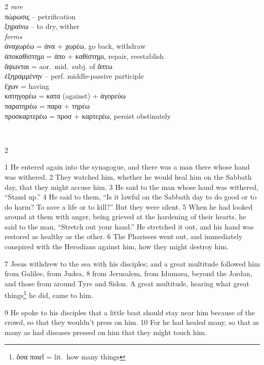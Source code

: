 \documentclass[10pt,a5paper,twoside,twocolumn]{book}
\newcommand*\cleartoleftpage{%
  \ifodd\value{page}\hbox{}\clearpage\fi
}
\newcommand{\separator}{
  \vspace{-0.5\baselineskip}%
  \hspace{0.27\textwidth}%
  \noindent\makebox[\linewidth]{\resizebox{0.3333\linewidth}{1pt}{$\bullet$}}\bigskip%
  \vspace{-0.5\baselineskip}
}
\newenvironment{facing}{\cleartoleftpage}{\clearpage\pagebreak}
\newenvironment{help}{\clearpage}{}
\newenvironment{helpsec}{\begin{minipage}[t]{\textwidth}\begin{multicols}{2}}{\end{multicols}\end{minipage}}
\newenvironment{vocab}{\begin{helpsec}}{\end{helpsec}}
\newenvironment{translation}{\separator\\\begin{helpsec}\footnotesize}{\end{helpsec}}
\begin{document}
\begin{facing}
\begin{help}
\begin{vocab}
\emph{rare}\\
πώρωσις -- petrification\\
ξηραίνω -- to dry, wither\\

\emph{forms}\\
ἀναχωρέω = ἀνα + χωρέω, go back, withdraw\\
ἀποκαθίστημι = ἀπο + καθίστημι, repair, reestablish\\
ἅψωνται = aor.~mid.~subj. of ἅπτω\\
ἐξηραμμένην -- perf. middle-passive participle\\
ἔχων = having\\
κατηγορέω = κατα (against) + ἀγορεύω \\
παρατηρέω = παρα + τηρέω\\
προσκαρτερέω = προσ + καρτερέω, persist obstinately\\
\end{vocab}
\begin{translation}

 1 He entered again into the synagogue, and there was a man there whose hand was withered. 2 They watched him, whether he would heal him on the Sabbath day, that they might accuse him. 
3 He said to the man whose hand was withered, ``Stand up.'' 4 He said to them, ``Is it lawful on the Sabbath day to do good or to do harm? To save a life or to kill?'' But they were silent. 5 When he had looked around at them with anger, being grieved at the hardening of their hearts, he said to the man, ``Stretch out your hand.'' He stretched it out, and his hand was restored as healthy as the other. 
6 The Pharisees went out, and immediately conspired with the Herodians against him, how they might destroy him.

7 Jesus withdrew to the sea with his disciples; and a great multitude followed him from Galilee, from Judea, 8 from Jerusalem, from Idumaea, beyond the Jordan, and those from around Tyre and Sidon. A great multitude, hearing what great things\footnote{ὅσα ποιεῖ = lit.~how many things} he did, came to him. 

9 He spoke to his disciples that a little boat should stay near him because of the crowd, so that they wouldn't press on him. 10 For he had healed many, so that as many as had diseases pressed on him that they might touch him.

\end{translation}
\end{help}
\end{facing}
\end{document}
